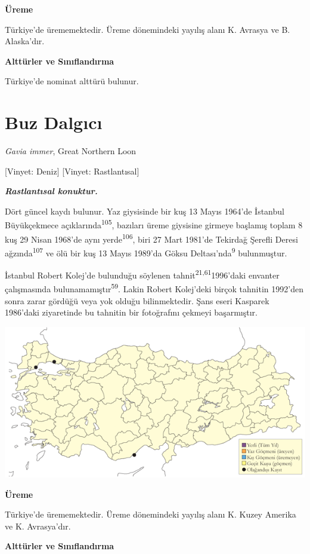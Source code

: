 \documentclass[
  letterpaper,
  DIV=11,
  numbers=noendperiod]{scrreprt}
\begin{document}
\textbf{Üreme}

Türkiye'de ürememektedir. Üreme dönemindeki yayılış alanı K. Avrasya ve
B. Alaska'dır.

\textbf{Alttürler ve Sınıflandırma}

Türkiye'de nominat alttürü bulunur.

\section{Buz Dalgıcı}\label{buz-dalgux131cux131}

\emph{Gavia immer}, Great Northern Loon

{[}Vinyet: Deniz{]} {[}Vinyet: Rastlantısal{]}

\textbf{\emph{Rastlantısal konuktur.}}

Dört güncel kaydı bulunur. Yaz giysisinde bir kuş 13 Mayıs 1964'de
İstanbul Büyükçekmece açıklarında\textsuperscript{105}, bazıları üreme
giysisine girmeye başlamış toplam 8 kuş 29 Nisan 1968'de aynı
yerde\textsuperscript{106}, biri 27 Mart 1981'de Tekirdağ Şerefli Deresi
ağzında\textsuperscript{107} ve ölü bir kuş 13 Mayıs 1989'da Göksu
Deltası'nda\textsuperscript{9} bulunmuştur.

İstanbul Robert Kolej'de bulunduğu söylenen
tahnit\textsuperscript{21,61}1996'daki envanter çalışmasında
bulunamamıştır\textsuperscript{59}. Lakin Robert Kolej'deki birçok
tahnitin 1992'den sonra zarar gördüğü veya yok olduğu bilinmektedir.
Şans eseri Kasparek 1986'daki ziyaretinde bu tahnitin bir fotoğrafını
çekmeyi başarmıştır.

\includegraphics{images/harita_Page_047.png}

\textbf{Üreme}

Türkiye'de ürememektedir. Üreme dönemindeki yayılış alanı K. Kuzey
Amerika ve K. Avrasya'dır.

\textbf{Alttürler ve Sınıflandırma}
\end{document}
